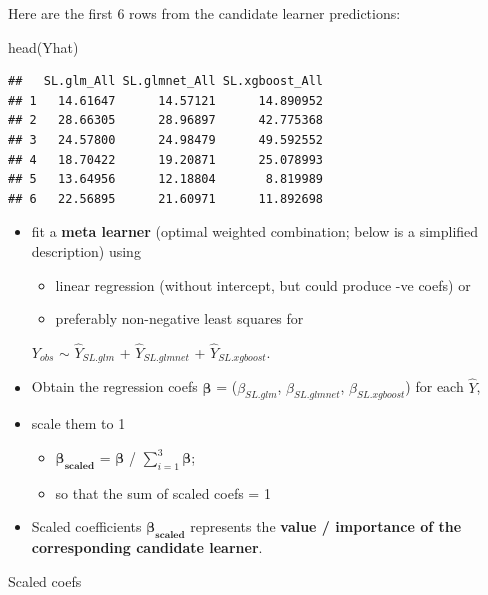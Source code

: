 \documentclass[
]{book}
\newenvironment{Shaded}{\begin{snugshade}}{\end{snugshade}}
\newcommand{\FunctionTok}[1]{\textcolor[rgb]{0.00,0.00,0.00}{#1}}
\newcommand{\NormalTok}[1]{#1}
\newcommand{\SpecialCharTok}[1]{\textcolor[rgb]{0.00,0.00,0.00}{#1}}
\providecommand{\tightlist}{%
  \setlength{\itemsep}{0pt}\setlength{\parskip}{0pt}}
\begin{document}
Here are the first 6 rows from the candidate learner predictions:

\begin{Shaded}
\begin{Highlighting}[]
\FunctionTok{head}\NormalTok{(Yhat)}
\end{Highlighting}
\end{Shaded}

\begin{verbatim}
##   SL.glm_All SL.glmnet_All SL.xgboost_All
## 1   14.61647      14.57121      14.890952
## 2   28.66305      28.96897      42.775368
## 3   24.57800      24.98479      49.592552
## 4   18.70422      19.20871      25.078993
## 5   13.64956      12.18804       8.819989
## 6   22.56895      21.60971      11.892698
\end{verbatim}

\begin{itemize}
\item
  fit a \textbf{meta learner} (optimal weighted combination; below is a simplified description) using

  \begin{itemize}
  \tightlist
  \item
    linear regression (without intercept, but could produce -ve coefs) or
  \item
    preferably non-negative least squares for
  \end{itemize}

  \(Y_{obs}\) \(\sim\) \(\hat{Y}_{SL.glm}\) + \(\hat{Y}_{SL.glmnet}\) + \(\hat{Y}_{SL.xgboost}\).
\item
  Obtain the regression coefs \(\mathbf{\beta}\) = (\(\beta_{SL.glm}\), \(\beta_{SL.glmnet}\), \(\beta_{SL.xgboost}\)) for each \(\hat{Y}\),
\item
  scale them to 1

  \begin{itemize}
  \tightlist
  \item
    \(\mathbf{\beta_{scaled}}\) = \(\mathbf{\beta}\) / \(\sum_{i=1}^3{\mathbf{\beta}}\);
  \item
    so that the sum of scaled coefs = 1
  \end{itemize}
\item
  Scaled coefficients \(\mathbf{\beta_{scaled}}\) represents the \textbf{value / importance of the corresponding candidate learner}.
\end{itemize}

Scaled coefs

\begin{Shaded}
\end{Shaded}
\end{document}
